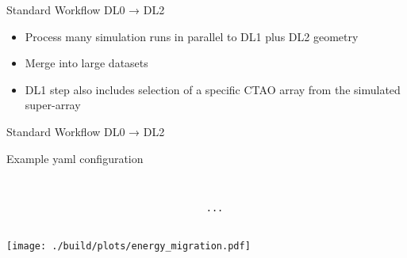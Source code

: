 \documentclass[aspectratio=1610, 9pt]{beamer}
\begin{document}
\begin{frame}{Standard Workflow DL0 → DL2}
  

  \bigskip
  \begin{itemize}
    \item Process many simulation runs in parallel to DL1 plus DL2 geometry
    \item Merge into large datasets
    \item DL1 step also includes selection of a specific CTAO array from the simulated super-array
  \end{itemize}
\end{frame}
\begin{frame}{Standard Workflow DL0 → DL2}
  
\end{frame}

\begin{frame}{Example yaml configuration}
  \footnotesize
  \begin{columns}[t, onlytextwidth]
    \begin{column}{0.495\textwidth}
      \inputminted[firstline=8, lastline=30]{yaml}{./config/train_energy_regressor.yml}
    \end{column}%
    \hfill%
    \begin{column}{0.495\textwidth}%
      \inputminted[firstline=31, lastline=50]{yaml}{./config/train_energy_regressor.yml}
      \hspace{4em}\texttt{...}
    \end{column}%
  \end{columns}
\end{frame}

\begin{frame}[c]
  \centering
        \texttt{[image: ./build/plots/energy\_migration.pdf]}
\end{frame}
\end{document}
